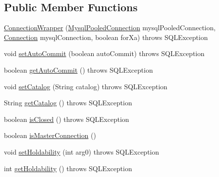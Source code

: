 \subsection*{Public Member Functions}
\begin{DoxyCompactItemize}
\item 
\mbox{\hyperlink{classcom_1_1mysql_1_1jdbc_1_1jdbc2_1_1optional_1_1_connection_wrapper_a4300303d3f60a9a817eb9db03d583034}{Connection\+Wrapper}} (\mbox{\hyperlink{classcom_1_1mysql_1_1jdbc_1_1jdbc2_1_1optional_1_1_mysql_pooled_connection}{Mysql\+Pooled\+Connection}} mysql\+Pooled\+Connection, \mbox{\hyperlink{interfacecom_1_1mysql_1_1jdbc_1_1_connection}{Connection}} mysql\+Connection, boolean for\+Xa)  throws S\+Q\+L\+Exception 
\item 
void \mbox{\hyperlink{classcom_1_1mysql_1_1jdbc_1_1jdbc2_1_1optional_1_1_connection_wrapper_ac27aa87d5bd9512af3870bd2a55af58d}{set\+Auto\+Commit}} (boolean auto\+Commit)  throws S\+Q\+L\+Exception 
\item 
boolean \mbox{\hyperlink{classcom_1_1mysql_1_1jdbc_1_1jdbc2_1_1optional_1_1_connection_wrapper_a63e8bc5e8a735a2d5201cfb7eeca77df}{get\+Auto\+Commit}} ()  throws S\+Q\+L\+Exception 
\item 
void \mbox{\hyperlink{classcom_1_1mysql_1_1jdbc_1_1jdbc2_1_1optional_1_1_connection_wrapper_a2cb3c951273c7b52846f8dc274f1e854}{set\+Catalog}} (String catalog)  throws S\+Q\+L\+Exception 
\item 
String \mbox{\hyperlink{classcom_1_1mysql_1_1jdbc_1_1jdbc2_1_1optional_1_1_connection_wrapper_a605f99324dcdb5ad3edd203a20c5438f}{get\+Catalog}} ()  throws S\+Q\+L\+Exception 
\item 
boolean \mbox{\hyperlink{classcom_1_1mysql_1_1jdbc_1_1jdbc2_1_1optional_1_1_connection_wrapper_a47d161db9f1e7918a2f7b4b7e6e2ae77}{is\+Closed}} ()  throws S\+Q\+L\+Exception 
\item 
boolean \mbox{\hyperlink{classcom_1_1mysql_1_1jdbc_1_1jdbc2_1_1optional_1_1_connection_wrapper_a4259500598efa1b3dc8cf4317792338b}{is\+Master\+Connection}} ()
\item 
void \mbox{\hyperlink{classcom_1_1mysql_1_1jdbc_1_1jdbc2_1_1optional_1_1_connection_wrapper_ac955a6ec897e91e8fbc06d350025e9fd}{set\+Holdability}} (int arg0)  throws S\+Q\+L\+Exception 
\item 
int \mbox{\hyperlink{classcom_1_1mysql_1_1jdbc_1_1jdbc2_1_1optional_1_1_connection_wrapper_aaa0a4cf3ff4b6cc1649b1908a691015a}{get\+Holdability}} ()  throws S\+Q\+L\+Exception 
\item 

\end{DoxyCompactItemize}
